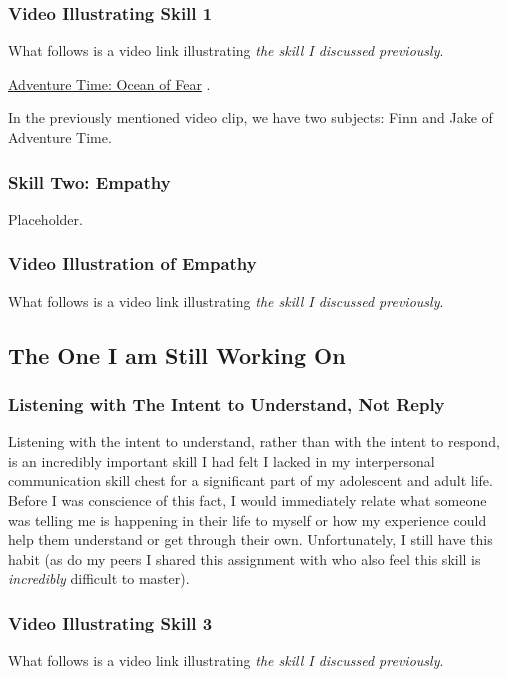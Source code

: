 \documentclass[stu,12pt]{apa7}
\begin{document}
        \subsubsection*{Video Illustrating Skill 1}
          What follows is a video link illustrating \textit{the skill I
            discussed previously}.

          \href{https://www.youtube.com/watch?v=cSSB4qPrfOg}{Adventure Time: %
            Ocean of Fear}
            \parencite[00:00:30--00:01:00]{leichliter_larry_adventure_2017}.

          In the previously mentioned video clip, we have two subjects: Finn
            and Jake of Adventure Time.


      \subsubsection{Skill Two: Empathy}
        Placeholder.

        \subsubsection*{Video Illustration of Empathy}
          What follows is a video link illustrating \textit{the skill I
            discussed previously}.


    \subsection{The One I am Still Working On}
      \subsubsection{Listening with The Intent to Understand, Not Reply}
        Listening with the intent to understand, rather than with the intent to
          respond, is an incredibly important skill I had felt I lacked in
          my interpersonal communication skill chest for a significant part of
          my adolescent and adult life. Before I was conscience of this fact, I
          would immediately relate what someone was telling me is happening in
          their life to myself or how my experience could help them understand
          or get through their own. Unfortunately, I still have this habit
          (as do my peers I shared this assignment with who also feel this
          skill is \textit{incredibly} difficult to master).

        \subsubsection*{Video Illustrating Skill 3}
          What follows is a video link illustrating \textit{the skill I
            discussed previously}.





  \newpage
  \nocite{*}
  \printbibliography[%
    title={Additional References},%
    heading={bibintoc},%
    category={consulted}%
  ]
\end{document}
